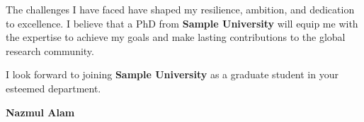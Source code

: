 \documentclass[11pt]{article}
\newif\ifshowsections
\begin{document}
\ifshowsections\section*{Conclusion}\fi

The challenges I have faced have shaped my resilience, ambition, and dedication to excellence. I believe that a
PhD from \textbf{Sample University} will equip me with the expertise to achieve my goals and make lasting
contributions to the global research community.

I look forward to joining \textbf{Sample University} as a graduate student in your esteemed department.

\begin{flushleft}
    \vspace{1.5em}
    \textbf{Nazmul Alam}
\end{flushleft}
\end{document}
